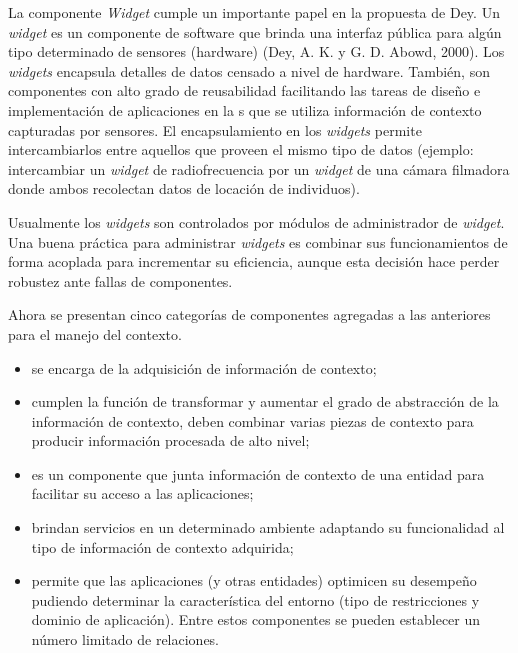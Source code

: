 La componente \textit{Widget} cumple un importante papel en la propuesta de Dey. Un \textit{widget} es un componente de software que brinda una interfaz pública para algún tipo determinado de sensores (hardware) (Dey, A. K. y G. D. Abowd, 2000). Los \textit{widgets} encapsula detalles de datos censado a nivel de hardware. También, son componentes con alto grado de reusabilidad facilitando las tareas de diseño e implementación de aplicaciones en la s que se utiliza información de contexto capturadas por sensores. El encapsulamiento en los \textit{widgets} permite intercambiarlos entre aquellos que proveen el mismo tipo de datos (ejemplo:
intercambiar un \textit{widget} de radiofrecuencia por un \textit{widget} de una cámara filmadora donde ambos recolectan datos de locación de individuos).

Usualmente los \textit{widgets} son controlados por módulos de administrador de \textit{widget}. Una buena práctica para administrar \textit{widgets} es combinar sus funcionamientos de forma acoplada para incrementar su eficiencia, aunque esta decisión hace perder robustez ante fallas de componentes.

Ahora se presentan cinco categorías de componentes agregadas a las anteriores para el manejo del contexto.


\begin{itemize}
 \item {} se encarga de la adquisición de información de contexto; 

\item {} cumplen la función de transformar y aumentar el
grado de abstracción de la información de contexto, deben combinar varias
piezas de contexto para producir información procesada de alto nivel;


\item {} es un componente que junta información de contexto
de una entidad para facilitar su acceso a las aplicaciones; 


\item {} brindan servicios en un determinado ambiente
adaptando su funcionalidad al tipo de información de contexto adquirida; 

\item {} permite que las aplicaciones (y otras entidades)
optimicen su desempeño pudiendo determinar la característica del entorno
(tipo de restricciones y dominio de aplicación). Entre estos componentes
se pueden establecer un número limitado de relaciones.

\end{itemize}

